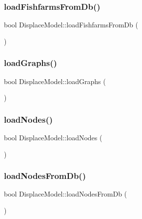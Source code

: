 \subsubsection{\texorpdfstring{loadFishfarmsFromDb()}{loadFishfarmsFromDb()}}
{\footnotesize\ttfamily bool Displace\+Model\+::load\+Fishfarms\+From\+Db (\begin{DoxyParamCaption}{ }\end{DoxyParamCaption})\hspace{0.3cm}{\ttfamily [protected]}}

\mbox{\label{class_displace_model_a657ac3dd1a2a8b8616a9de34ff9fd6ea}} 
\subsubsection{\texorpdfstring{loadGraphs()}{loadGraphs()}}
{\footnotesize\ttfamily bool Displace\+Model\+::load\+Graphs (\begin{DoxyParamCaption}{ }\end{DoxyParamCaption})\hspace{0.3cm}{\ttfamily [protected]}}

\mbox{\label{class_displace_model_a23eaed735312875b66958c4e5de6093f}} 
\subsubsection{\texorpdfstring{loadNodes()}{loadNodes()}}
{\footnotesize\ttfamily bool Displace\+Model\+::load\+Nodes (\begin{DoxyParamCaption}{ }\end{DoxyParamCaption})\hspace{0.3cm}{\ttfamily [protected]}}

\mbox{\label{class_displace_model_a1c71c71e1e46dfc429950fbafd10613a}} 
\subsubsection{\texorpdfstring{loadNodesFromDb()}{loadNodesFromDb()}}
{\footnotesize\ttfamily bool Displace\+Model\+::load\+Nodes\+From\+Db (\begin{DoxyParamCaption}{ }\end{DoxyParamCaption})\hspace{0.3cm}{\ttfamily [protected]}}

